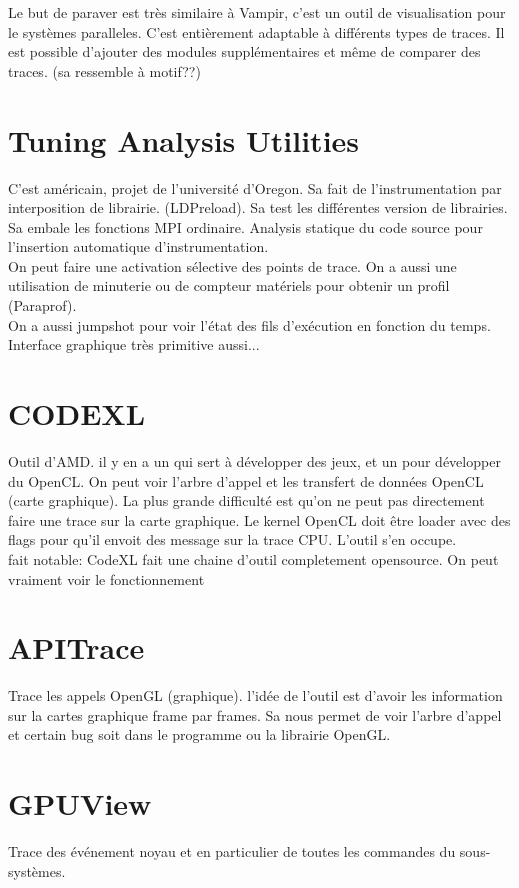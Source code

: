 \documentclass[oneside]{book}
\begin{document}
Le but de paraver est très similaire à Vampir, c'est un outil de visualisation pour le systèmes paralleles. C'est entièrement adaptable à différents types de traces. Il est possible d'ajouter des modules supplémentaires et même de comparer des traces. (sa ressemble à motif??)
\section{Tuning Analysis Utilities}
C'est américain, projet de l'université d'Oregon. Sa fait de l'instrumentation par interposition de librairie. (LDPreload). Sa test les différentes version de librairies. Sa embale les fonctions MPI ordinaire. Analysis statique du code source pour l'insertion automatique d'instrumentation.\\

On peut faire une activation sélective des points de trace. On a aussi une utilisation de minuterie ou de compteur matériels pour obtenir un profil (Paraprof).\\

On a aussi jumpshot pour voir l'état des fils d'exécution en fonction du temps.\\

Interface graphique très primitive aussi...

\section{CODEXL}
Outil d'AMD. il y en a un qui sert à développer des jeux, et un pour développer du OpenCL. On peut voir l'arbre d'appel et les transfert de données OpenCL (carte graphique).  La plus grande difficulté est qu'on ne peut pas directement faire une trace sur la carte graphique. Le kernel OpenCL doit être loader avec des flags pour qu'il envoit des message sur la trace CPU. L'outil s'en occupe.\\

fait notable: CodeXL fait une chaine d'outil completement opensource. On peut vraiment voir le fonctionnement
\section{APITrace}
Trace les appels OpenGL (graphique). l'idée de l'outil est d'avoir les information sur la cartes graphique frame par frames. Sa nous permet de voir l'arbre d'appel et certain bug soit dans le programme ou la librairie OpenGL.
\section{GPUView}
Trace des événement noyau et en particulier de toutes les commandes du sous-systèmes.
\end{document}
